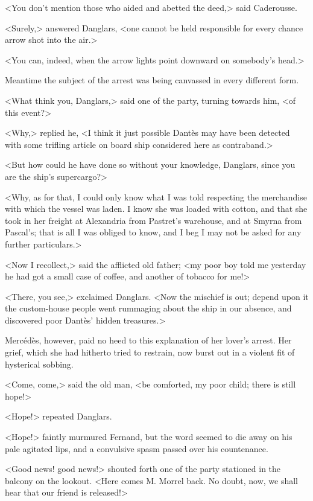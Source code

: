  <You don't mention those who aided and abetted the deed,> said Caderousse. 

 <Surely,> answered Danglars, <one cannot be held responsible for every chance arrow shot into the air.> 

 <You can, indeed, when the arrow lights point downward on somebody's head.> 

 Meantime the subject of the arrest was being canvassed in every different form. 

 <What think you, Danglars,> said one of the party, turning towards him, <of this event?> 

 <Why,> replied he, <I think it just possible Dantès may have been detected with some trifling article on board ship considered here as contraband.> 

 <But how could he have done so without your knowledge, Danglars, since you are the ship's supercargo?> 

 <Why, as for that, I could only know what I was told respecting the merchandise with which the vessel was laden. I know she was loaded with cotton, and that she took in her freight at Alexandria from Pastret's warehouse, and at Smyrna from Pascal's; that is all I was obliged to know, and I beg I may not be asked for any further particulars.> 

 <Now I recollect,> said the afflicted old father; <my poor boy told me yesterday he had got a small case of coffee, and another of tobacco for me!> 

 <There, you see,> exclaimed Danglars. <Now the mischief is out; depend upon it the custom-house people went rummaging about the ship in our absence, and discovered poor Dantès' hidden treasures.> 

 Mercédès, however, paid no heed to this explanation of her lover's arrest. Her grief, which she had hitherto tried to restrain, now burst out in a violent fit of hysterical sobbing. 

 <Come, come,> said the old man, <be comforted, my poor child; there is still hope!> 

 <Hope!> repeated Danglars. 

 <Hope!> faintly murmured Fernand, but the word seemed to die away on his pale agitated lips, and a convulsive spasm passed over his countenance. 

 <Good news! good news!> shouted forth one of the party stationed in the balcony on the lookout. <Here comes M. Morrel back. No doubt, now, we shall hear that our friend is released!> 

